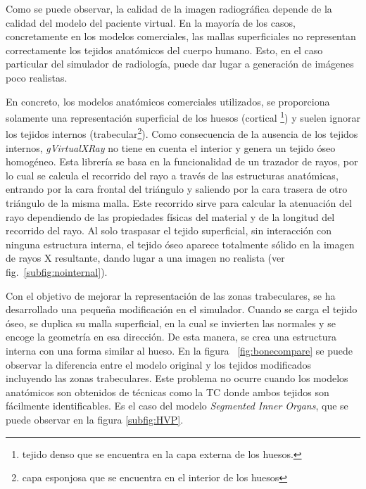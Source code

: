 Como se puede observar, la calidad de la imagen radiográfica depende de la calidad del modelo del paciente virtual. %
En la mayoría de los casos, concretamente en los modelos comerciales, las mallas superficiales no representan correctamente los tejidos anatómicos del cuerpo humano. Esto, en el caso particular del simulador de radiología,  puede dar lugar a generación de imágenes poco realistas. 

En concreto, los modelos anatómicos comerciales utilizados, se proporciona solamente una representación  superficial de los huesos (cortical \footnote{tejido denso que se encuentra en la capa externa de los huesos.}) y suelen ignorar los tejidos internos (trabecular\footnote{capa esponjosa que se encuentra en el interior de los huesos}). Como consecuencia de la ausencia de los tejidos internos, \emph{gVirtualXRay} no tiene en cuenta el interior y genera un tejido óseo homogéneo. 
Esta librería se basa en la funcionalidad de un trazador de rayos, por lo cual se calcula el recorrido del rayo a través de las estructuras anatómicas, entrando por la cara frontal del triángulo y saliendo por la cara trasera de otro triángulo de la misma malla. Este recorrido sirve para calcular la atenuación del rayo dependiendo de las propiedades físicas del material y de la longitud del recorrido del rayo. Al solo traspasar el tejido superficial, sin interacción con ninguna estructura interna, el tejido óseo aparece totalmente sólido en la imagen de rayos X resultante, dando lugar a una imagen no realista (ver fig.~\ref{subfig:nointernal}).

Con el objetivo de mejorar la representación de las zonas trabeculares, se ha desarrollado una pequeña modificación en el simulador. Cuando se carga el tejido óseo, se duplica su malla superficial, en la cual se invierten las normales y se encoge la geometría en esa dirección. De esta manera, se crea una estructura interna con una forma similar al hueso. En la figura ~\ref{fig:bonecompare} se puede observar la diferencia entre el modelo original y los tejidos modificados incluyendo las zonas trabeculares. Este problema no ocurre cuando los modelos anatómicos son obtenidos de técnicas como la \ac{TC} donde ambos tejidos son fácilmente identificables. Es el caso del modelo \emph{Segmented Inner Organs}\cite{VoxelMan}, que se puede observar en la figura \ref{subfig:HVP}.




